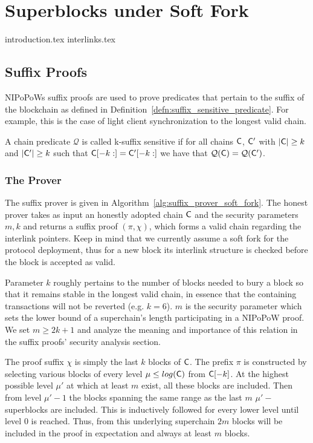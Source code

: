 \chapter{Superblocks under Soft Fork}

{introduction.tex} 
{interlinks.tex} 

\section{Suffix Proofs}
NIPoPoWs suffix proofs are used to prove predicates that pertain to the suffix of the blockchain as defined in Definition~\ref{defn:suffix_sensitive_predicate}. For example, this is the case of light client synchronization to the longest valid chain.


\begin{definition}
	\label{defn:suffix_sensitive_predicate}
	A chain predicate $\mathcal{Q}$ is called k-suffix sensitive if for all chains $\mathsf{C}$, $\mathsf{C}'$ with $\lvert \mathsf{C} \rvert \geq k$ and $\lvert \mathsf{C}' \rvert \geq k$ such that $\mathsf{C}[-k:] = \mathsf{C}'[-k:]$ we have that $\mathcal{Q}(\mathsf{C}) = \mathcal{Q}(\mathsf{C}')$. 
\end{definition}

\subsection{The Prover}
The suffix prover is given in Algorithm~\ref{alg:suffix_prover_soft_fork}.
The honest prover takes as input an honestly adopted chain $\mathsf{C}$ and the security parameters $m, k$ and returns a suffix proof $(\pi, \chi)$, which forms a valid chain regarding the interlink pointers. Keep in mind that we currently assume a soft fork for the protocol deployment, thus for a new block its interlink structure is checked before the block is accepted as valid. 

Parameter $k$ roughly pertains to the number of blocks needed to bury a block so that it remains stable in the longest valid chain, in essence that the containing transactions will not be reverted (e.g. $k = 6$). $m$ is the security parameter which sets the lower bound of a superchain's length participating in a NIPoPoW proof. We set $m \geq 2k +1$ and analyze the meaning and importance of this relation in the suffix proofs' security analysis section.

The proof suffix $\chi$ is simply the last $k$ blocks of $\mathsf{C}$. The prefix $\pi$ is constructed by selecting various blocks of every level $\mu \leq log(\mathsf{C})$ from $\mathsf{C}[-k]$. At the highest possible level $\mu'$ at which at least $m$ exist, all these blocks are included. Then from level $\mu' -1$ the blocks spanning the same range as the last $m$ $\mu'-$superblocks are included. This is inductively followed for every lower level until level 0 is reached. Thus, from this underlying superchain $2m$ blocks will be included in the proof in expectation and always at least $m$ blocks.


